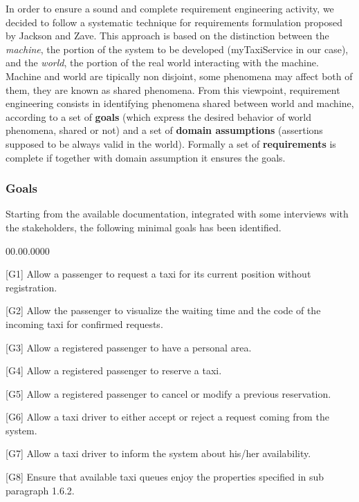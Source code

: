 In order to ensure a sound and complete requirement engineering activity,
we decided to follow a systematic technique for requirements formulation
proposed by Jackson and Zave. This approach is based on the distinction
between the \emph{machine}, the portion of the system to be developed
(myTaxiService in our case), and the \emph{world}, the portion of
the real world interacting with the machine. Machine and world are
tipically non disjoint, some phenomena may affect both of them, they
are known as shared phenomena. From this viewpoint, requirement engineering
consists in identifying phenomena shared between world and machine,
according to a set of \textbf{goals }(which express the desired behavior
of world phenomena, shared or not) and a set of \textbf{domain assumptions}
(assertions supposed to be always valid in the world). Formally a
set of \textbf{requirements }is complete if together with domain assumption
it ensures the goals.


\subsubsection{Goals}

Starting from the available documentation, integrated with some interviews
with the stakeholders, the following minimal goals has been identified.
\begin{lyxlist}{00.00.0000}
\item [{{[}G1{]}}] Allow a passenger to request a taxi for its current
position without registration.
\item [{{[}G2{]}}] Allow the passenger to visualize the waiting time and
the code of the incoming taxi for confirmed requests.
\item [{{[}G3{]}}] Allow a registered passenger to have a personal area.
\item [{{[}G4{]}}] Allow a registered passenger to reserve a taxi.
\item [{{[}G5{]}}] Allow a registered passenger to cancel or modify a previous
reservation. 
\item [{{[}G6{]}}] Allow a taxi driver to either accept or reject a request
coming from the system.
\item [{{[}G7{]}}] Allow a taxi driver to inform the system about his/her
availability.
\item [{{[}G8{]}}] Ensure that available taxi queues enjoy the properties
specified in sub paragraph 1.6.2.
\end{lyxlist}

